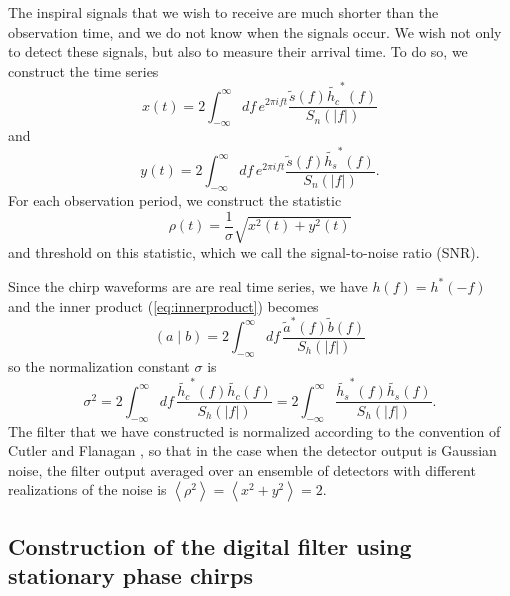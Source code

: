 The inspiral signals that we wish to receive are much shorter than the
observation time, and we do not know when the signals occur. We wish not only
to detect these signals, but also to measure their arrival time. To do so, we
construct the time series
\begin{equation}
\label{eq:xcts}
x(t) = 2 \int_{-\infty}^{\infty}df\,e^{2\pi i f t} 
\frac{\tilde{s}(f) \tilde{h_c}^\ast(f)}{S_n\left(\left|f\right|\right)}
\end{equation}
and
\begin{equation}
\label{eq:ycts}
y(t) = 2 \int_{-\infty}^{\infty}df\,e^{2\pi i f t} 
\frac{\tilde{s}(f) \tilde{h_s}^\ast(f)}{S_n\left(\left|f\right|\right)}.
\end{equation}
For each observation period, we construct the statistic
\begin{equation}
\rho(t) = \frac{1}{\sigma}\sqrt{x^2(t) + y^2(t)}
\end{equation}
and threshold on this statistic, which we call the signal-to-noise ratio
(SNR).

Since the chirp waveforms are are real time series, we have $h(f) =
h^\ast(-f)$ and the inner product (\ref{eq:innerproduct}) becomes
\begin{equation}
\left(a\mid b\right) = 2 \int_{-\infty}^{\infty}df\,
\frac{\tilde{a}^\ast(f)\tilde{b}(f)}{S_h\left(\left|f\right|\right)}
\end{equation}
so the normalization constant $\sigma$ is
\begin{equation}
\label{eq:sigmasqcts}
\sigma^2 = 2 \int_{-\infty}^{\infty}df\,
\frac{\tilde{h_c}^\ast(f)\tilde{h_c}(f)}{S_h\left(\left|f\right|\right)} 
= 2 \int_{-\infty}^\infty 
\frac{\tilde{h_s}^\ast(f)\tilde{h_s}(f)}{S_h\left(\left|f\right|\right)}.
\end{equation}
The filter that we have constructed is normalized according to the convention
of Cutler and Flanagan \cite{cutflan}, so that in the case when the detector
output is Gaussian noise, the filter output averaged over an ensemble of
detectors with different realizations of the noise is
$\left\langle \rho^2 \right\rangle = \left\langle x^2 + y^2 \right\rangle = 2$.

\subsection{Construction of the digital filter using stationary phase chirps}
\label{ss:digitalfilter}

